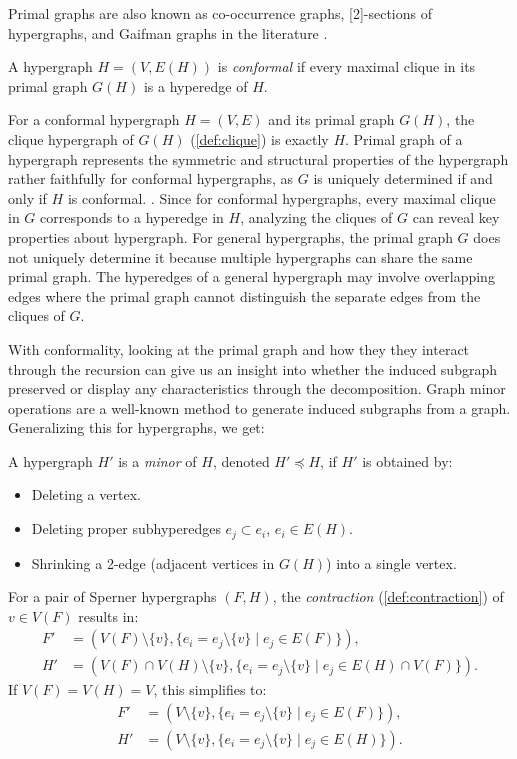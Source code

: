 Primal graphs are also known as co-occurrence graphs, [2]-sections of hypergraphs, and Gaifman graphs in the literature \cite{DPP18}.

\begin{definition}
A hypergraph $H=(V,E(H))$ is \emph{conformal} if every maximal clique in its primal graph $G(H)$ is a hyperedge of $H$.
\end{definition}

For a conformal hypergraph $H=(V,E)$ and its primal graph $G(H)$, the clique hypergraph of $G(H)$ (\ref{def:clique}) is exactly $H$. Primal graph of a hypergraph represents the symmetric and structural properties of the hypergraph rather faithfully for conformal hypergraphs, as $G$ is uniquely determined if and only if $H$ is conformal. \cite{GMR06}. Since for conformal hypergraphs, every maximal clique in $G$ corresponds to a hyperedge in $H$, analyzing the cliques of $G$ can reveal key properties about hypergraph. For general hypergraphs, the primal graph $G$ does not uniquely determine it because multiple hypergraphs can share the same primal graph. The hyperedges of a general hypergraph may involve overlapping edges where the primal graph cannot distinguish the separate edges from the cliques of $G$.

With conformality, looking at the primal graph and how they they interact through the \FKA{} recursion can give us an insight into whether the induced subgraph preserved or display any characteristics through the decomposition. Graph minor operations are a well-known method to generate induced subgraphs from a graph. Generalizing this for hypergraphs, we get:

A hypergraph $H'$ is a \emph{minor} of $H$, denoted $H'\preceq H$, if $H'$ is obtained by:
\begin{itemize}
\item Deleting a vertex.
\item Deleting proper subhyperedges $e_j\subset e_i$, $e_i\in E(H)$.
\item Shrinking a 2-edge (adjacent vertices in $G(H)$) into a single vertex.
\end{itemize}

For a pair of Sperner hypergraphs $(F,H)$, the \emph{contraction} (\ref{def:contraction}) of $v\in V(F)$ results in:
\begin{align*}
F'&=\left(V(F)\setminus\{v\},\{e_i=e_j\setminus\{v\}\mid e_j\in E(F)\}\right),\\
H'&=\left(V(F)\cap V(H)\setminus\{v\},\{e_i=e_j\setminus\{v\}\mid e_j\in E(H)\cap V(F)\}\right).
\end{align*}
If $V(F)=V(H)=V$, this simplifies to:
\begin{align*}
F'&=\left(V\setminus\{v\},\{e_i=e_j\setminus\{v\}\mid e_j\in E(F)\}\right),\\
H'&=\left(V\setminus\{v\},\{e_i=e_j\setminus\{v\}\mid e_j\in E(H)\}\right).
\end{align*}

